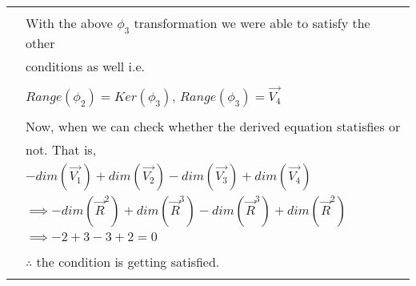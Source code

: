 \documentclass[journal,12pt]{IEEEtran}
\begin{document}
\begin{longtable}{|l|l|}
		& \\
		& With the above $\phi_3$ transformation we were able to satisfy the other \\
		& conditions as well i.e.\\
		& \\
		& \qquad \qquad \qquad  $Range(\phi_2) = Ker(\phi_3)$, $Range(\phi_3) = \vec{V_4}$\\
		& \\
		& Now, when we can check whether the derived equation statisfies or \\
		& not. That is, \\
		& \qquad \qquad \qquad $- dim(\vec{V_1}) + dim(\vec{V_2}) - dim(\vec{V_3}) + dim(\vec{V_4}) $ \\
		& \qquad \qquad $\implies - dim(\vec{R}^{2}) + dim(\vec{R}^{3}) - dim(\vec{R}^{3}) + dim(\vec{R}^{2}) $ \\
		& \qquad \qquad $\implies - 2 + 3 - 3 + 2  = 0$ \\
		& \\
		& $\therefore$ the condition is getting satisfied.\\
		& \\
		\hline
	\end{longtable}
		
\end{document}
